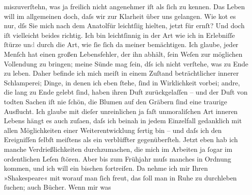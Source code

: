 \begin{ledgroupsized}[t]{13cm}
               miszuverſtehn, was ja freilich nicht angenehmer iſt als ſich zu kennen. Das Leben
               will im allgemeinen doch, daſs wir zur Klarheit über uns gelangen.\pend
           \pstart
           Wie ko{\geminationm}t es nur, dſs Sie mich nach dem Anatolfür leichtſi{\geminationn}ig
               hielten, jetzt für ernſt? Und doch iſt vielleicht beides richtig. Ich bin
               leichtſinnig in der Art wie ich in Erlebniſſe ſtürze un\textcolor{gray}{d}{ }\label{T_L00643_1v}\label{T_L00643_1h} durch
               die Art, wie ſie ſich da{\geminationn} meiner bemächtigen. Ich
               glaube, jeder Menſch hat einen großen Lebensfehler, der ihn abhält, ſein Weſen zur
               möglichen Vollendung zu bringen; meine Sünde mag ſein, dſs ich nicht verſtehe, was zu
               Ende zu leben. Daher befinde ich mich meiſt in einem Zuſtand beträchtlicher innerer
               Schlamperei; Dinge, in denen ich eben ſtehe, ſind in Wirklichkeit {\pb}vorbei; andre, die lang zu Ende gelebt ſind, haben
               ihren Duft zurückgelaſſen – und der Duft von todten Sachen iſt nie ſchön, die Blumen
               auf den Gräbern ſind eine traurige Ausflucht. Ich glaube mit dieſer unreinlichen ja
               faſt unmoraliſchen Art inneren Lebens hängt es auch zuſa\textcolor{gray}{{\geminationm}}en, daſs ich beinah in jedem Einzelfall gedanklich mit allen Möglichkeiten
               einer Weiterentwicklung fertig bin – und daſs ich den Ereigniſſen ſelbſt meiſtens als
               ein verblüffter gegenüberſteh.\pend
           \pstart
           {\pb}Jetzt eben hab ich manche Verdrießlichkeiten
               durchzumachen, die mich im Arbeiten ja ſogar im ordentlichen Leſen ſtören. Aber bis
               zum Frühjahr muſs manches in Ordnung kommen, und ich will ein bischen fortreiſen. Da
               nehme ich mir Ihren »Shakespeare« mit worauf man
               ſich freut, das ſoll man in Ruhe zu durchleben ſuchen; auch Bücher. Wenn mir was

\end{ledgroupsized}
